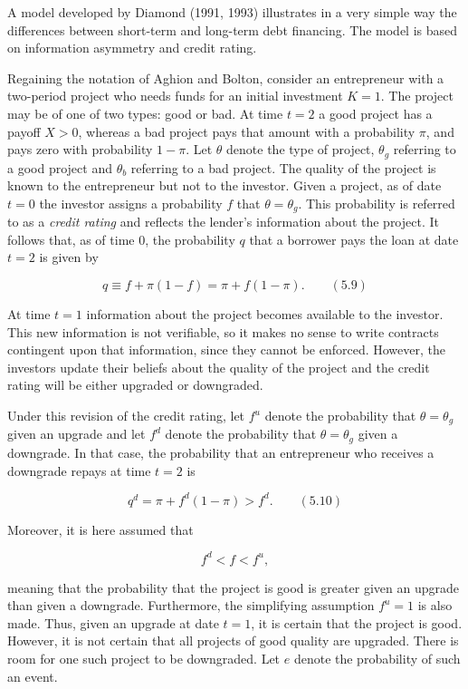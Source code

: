 \documentclass[11pt,a4paper]{article}
\begin{document}
A model developed by Diamond (1991, 1993) illustrates in a very simple way the differences between
short-term and long-term debt financing. The model is based on information asymmetry and credit
rating.

Regaining the notation of Aghion and Bolton, consider an entrepreneur with a two-period project who
needs funds for an initial investment \(K = 1\). The project may be of one of two types: good or
bad. At time \(t = 2\) a good project has a payoff \(X > 0\), whereas a bad project pays that amount
with a probability \(\pi\), and pays zero with probability \(1 - \pi\). Let \(\theta\) denote the
type of project, \(\theta_g\) referring to a good project and \(\theta_b\) referring to a bad
project. The quality of the project is known to the entrepreneur but not to the investor. Given a
project, as of date \(t = 0\) the investor assigns a probability \(f\) that \(\theta = \theta_g\).
This probability is referred to as a \emph{credit rating} and reflects the lender's information
about the project. It follows that, as of time 0, the probability \(q\) that a borrower pays the
loan at date \(t = 2\) is given by

\[q \equiv f + \pi(1 - f) = \pi + f(1 - \pi). \qquad (5.9)\]

At time \(t = 1\) information about the project becomes available to the investor. This new
information is not verifiable, so it makes no sense to write contracts contingent upon that
information, since they cannot be enforced. However, the investors update their beliefs about the
quality of the project and the credit rating will be either upgraded or downgraded.

Under this revision of the credit rating, let \(f^u\) denote the probability that
\(\theta = \theta_g\) given an upgrade and let \(f^d\) denote the probability that
\(\theta = \theta_g\) given a downgrade. In that case, the probability that an entrepreneur who
receives a downgrade repays at time \(t = 2\) is

\[q^d = \pi + f^d(1 - \pi) > f^d. \qquad (5.10)\]

Moreover, it is here assumed that

\[f^d < f < f^u,\]

meaning that the probability that the project is good is greater given an upgrade than given a
downgrade. Furthermore, the simplifying assumption \(f^u = 1\) is also made. Thus, given an upgrade
at date \(t = 1\), it is certain that the project is good. However, it is not certain that all
projects of good quality are upgraded. There is room for one such project to be downgraded. Let
\(e\) denote the probability of such an event.
\end{document}
